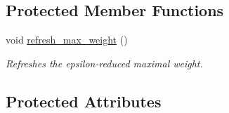 \subsection*{Protected Member Functions}
\begin{DoxyCompactItemize}
\item 
\hypertarget{a00362_a320eef5addc6f6f4ae3a49f8a3abdd64}{void \hyperlink{a00362_a320eef5addc6f6f4ae3a49f8a3abdd64}{refresh\-\_\-max\-\_\-weight} ()}\label{a00362_a320eef5addc6f6f4ae3a49f8a3abdd64}

\begin{DoxyCompactList}\small\item\em Refreshes the epsilon-\/reduced maximal weight. \end{DoxyCompactList}\end{DoxyCompactItemize}
\subsection*{Protected Attributes}
